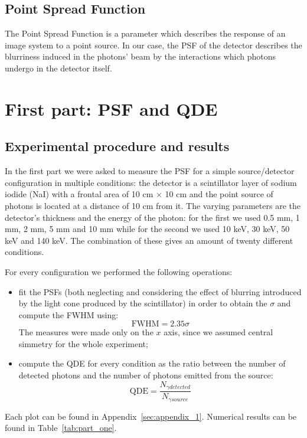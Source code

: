 \documentclass[a4paper]{article}
\begin{document}
\subsection{Point Spread Function}
The Point Spread Function is a parameter which describes the response of an image system to a point source. In our case, the PSF of the detector describes the blurriness induced in the photons' beam by the interactions which photons undergo in the detector itself.

\section{First part: PSF and QDE}
\subsection{Experimental procedure and results}
In the first part we were asked to measure the PSF for a simple source/detector configuration in multiple conditions: the detector is a scintillator layer of sodium iodide (NaI) with a frontal area of 10 cm $\times$ 10 cm and the point source of photons is located at a distance of 10 cm from it. The varying parameters are the detector's thickness and the energy of the photon: for the first we used 0.5 mm, 1 mm, 2 mm, 5 mm and 10 mm while for the second we used 10 keV, 30 keV, 50 keV and 140 keV. The combination of these gives an amount of twenty different conditions.

For every configuration we performed the following operations:
\begin{itemize}
  \item fit the PSFs (both neglecting and considering the effect of blurring introduced by the light cone produced by the scintillator) in order to obtain the $\sigma$ and compute the FWHM using:
    \begin{equation}
      \text{FWHM}=2.35\sigma
      \label{eq:fwhm}
    \end{equation}
    The measures were made only on the $x$ axis, since we assumed central simmetry for the whole experiment;
  \item compute the QDE for every condition as the ratio between the number of detected photons and the number of photons emitted from the source:
    \begin{equation}
      \text{QDE}=\frac{N_{\gamma detected}}{N_{\gamma source}}
      \label{eq:qde}
    \end{equation}
\end{itemize}
Each plot can be found in Appendix~\ref{sec:appendix_1}. Numerical results can be found in Table~\ref{tab:part_one}.
\end{document}
